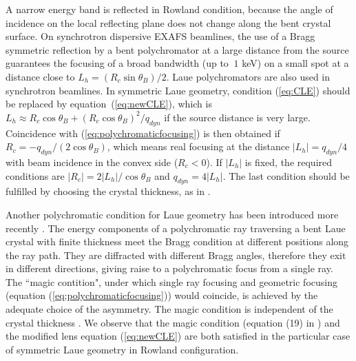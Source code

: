 \documentclass[preprint]{iucr}              %
\newcommand{\inred}[1]{{\color{red}#1}}
\begin{document}
A narrow energy band \inred{is reflected in Rowland condition}, because the angle of incidence on the local reflecting plane does not change along the bent crystal surface.
\inred{
On synchrotron dispersive EXAFS beamlines, the use of a Bragg symmetric reflection by a bent polychromator at a large distance from the source guarantees the focusing of a broad bandwidth (up to $~1$ keV) on a small spot \cite{Tolentino:ms0206} at a distance close to $L_h=(R_c\sin\theta_B)/2$. 
}
Laue polychromators are also used in synchrotron beamlines.
\inred{In symmetric Laue geometry, condition (\ref{eq:CLE}) should be replaced by equation~(\ref{eq:newCLE}), which is $L_h \approx R_c \cos\theta_B + (R_c \cos\theta_B) ^2 / q_{dyn}$ if the source distance is very large.} 
\inred{Coincidence with (\ref{eq:polychromaticfocusing}) is then obtained} if
$R_c=-q_{dyn}/(2\cos\theta_B)$,
\inred{which means} real focusing at the distance $|L_h|=q_{dyn}/4$ with beam incidence in the  convex side ($R_c<0$). 
\inred{If $|L_h|$ is fixed, the required conditions are $|R_c| = 2 |L_h| / \cos\theta_B$ and $q_{dyn}=4|L_h|$. The last condition should be fulfilled by choosing} the crystal thickness, as in  \cite{Mocella2004,Mocella2008}.

\inred{Another polychromatic condition for Laue geometry has been introduced more recently \cite{Martinson, PengQi, PengQi2021}.
The energy components of a polychromatic ray traversing a bent Laue crystal with finite thickness meet the Bragg condition at different positions along the ray path. They are diffracted with different Bragg angles, therefore they exit in different directions, giving raise to a polychromatic focus from a single ray. The ``magic contition", under which single ray focusing and geometric focusing (equation (\ref{eq:polychromaticfocusing})) would coincide, is achieved by the adequate choice of the asymmetry. The magic condition is independent of the crystal thickness \cite{PengQi2021}. We observe that the magic condition (equation (19) in \cite{PengQi2021}) and the modified lens equation (\ref{eq:newCLE}) are both satisfied in the particular case of symmetric Laue geometry in Rowland configuration.   

}
\end{document}
